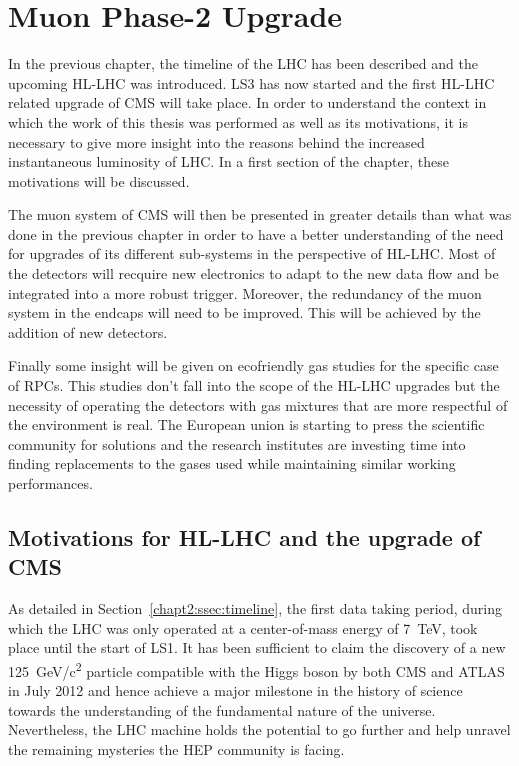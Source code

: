 \renewcommand\evenpagerightmark{{\scshape\small Chapter 3}}
\renewcommand\oddpageleftmark{{\scshape\small Muon Phase-2 Upgrade}}

\renewcommand{\bibname}{References}

\hyphenation{}

\chapter[Muon Phase-2 Upgrade]%
{Muon Phase-2 Upgrade}
\label{chapt:3}
		
	In the previous chapter, the timeline of the LHC has been described and the upcoming \acl{HL-LHC} was introduced. LS3 has now started and the first HL-LHC related upgrade of CMS will take place. In order to understand the context in which the work of this thesis was performed as well as its motivations, it is necessary to give more insight into the reasons behind the increased instantaneous luminosity of LHC. In a first section of the chapter, these motivations will be discussed.
	
	The muon system of CMS will then be presented in greater details than what was done in the previous chapter in order to have a better understanding of the need for upgrades of its different sub-systems in the perspective of HL-LHC. Most of the detectors will recquire new electronics to adapt to the new data flow and be integrated into a more robust trigger. Moreover, the redundancy of the muon system in the endcaps will need to be improved. This will be achieved by the addition of new detectors.
	
	Finally some insight will be given on ecofriendly gas studies for the specific case of \acl{RPC}s. This studies don't fall into the scope of the HL-LHC upgrades but the necessity of operating the detectors with gas mixtures that are more respectful of the environment is real. The European union is starting to press the scientific community for solutions and the research institutes are investing time into finding replacements to the gases used while maintaining similar working performances.
	
\section{Motivations for HL-LHC and the upgrade of CMS}
\label{chapt3:sec:motivations}

	As detailed in Section~\ref{chapt2:ssec:timeline}, the first data taking period, during which the LHC was only operated at a center-of-mass energy of \SI{7}{TeV}, took place until the start of LS1. It has been sufficient to claim the discovery of a new \SI{125}{GeV/c^2} particle compatible with the Higgs boson by both CMS and ATLAS in July 2012 and hence achieve a major milestone in the history of science towards the understanding of the fundamental nature of the universe. Nevertheless, the LHC machine holds the potential to go further and help unravel the remaining mysteries the \acf{HEP} community is facing.
	
